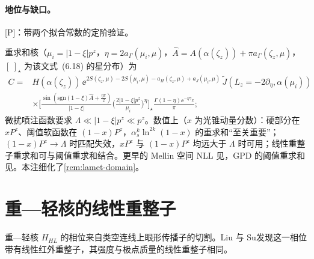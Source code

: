 \paragraph{地位与缺口。}[P]：带两个拟合常数的定阶验证\cite[第~5~节、式~(5.7)、(5.10)--(5.11)]{Ji:2023pba}。

\begin{remark}\label{rem:yzliu-threshold-domain}
重求和核\cite[式~(6.19)]{Ji:2023pba}（$\mu_i=|1-\xi|p^z$，$\eta=2a_\Gamma(\mu_i,\mu)$，$\hat A=A(\alpha(\zeta_z))+\pi a_\Gamma(\zeta_z,\mu)$，$[\ ]_\star$ 为该文式~(6.18) 的星分布）为 %
\begin{equation*}
\begin{aligned}
C={}&H(\alpha(\zeta_z))\,\ee^{2S(\zeta_z,\mu)-2S(\mu_i,\mu)-a_H(\zeta_z,\mu)+a_J(\mu_i,\mu)}\,\tilde J(L_z=-2\partial_\eta,\alpha(\mu_i))\\
&\times\Big[\frac{\sin(\mathrm{sgn}(1-\xi)\hat A+\frac{\eta\pi}2)}{|1-\xi|}\Big(\frac{2|1-\xi|p^z}{\mu_i}\Big)^\eta\Big]_\star\frac{\Gamma(1-\eta)\ee^{-\eta\gamma_E}}\pi ;
\end{aligned}
\end{equation*}
微扰喷注函数要求 $\Lambda\ll|1-\xi|p^z\ll p^z$。数值上\cite{Ji:2024hit}（$x$ 为光锥动量分数）：硬部分在 $xP^z$、阈值软函数在 $(1-x)P^z$，$\alpha_s^k\ln^{2k}(1-x)$ 的重求和“至关重要”；$(1-x)P^z\to\Lambda$ 时匹配失效，$xP^z$ 与 $(1-x)P^z$ 均远大于 $\Lambda$ 时可用；线性重整子重求和可与阈值重求和结合。更早的 Mellin 空间 NLL 见\cite{Gao:2021hxl}，GPD 的阈值重求和见\cite{Holligan:2025baj}。本注细化了\cref{rem:lamet-domain}。
\end{remark}

\section{重—轻核的线性重整子}\label{sec:yzliu-renormalon}

重—轻核 $H_{HL}$ 的相位来自类空连线上眼形传播子的切割。Liu 与 Su\cite{Liu:2023onm}发现这一相位带有线性红外重整子，其强度与极点质量的线性重整子相同。


